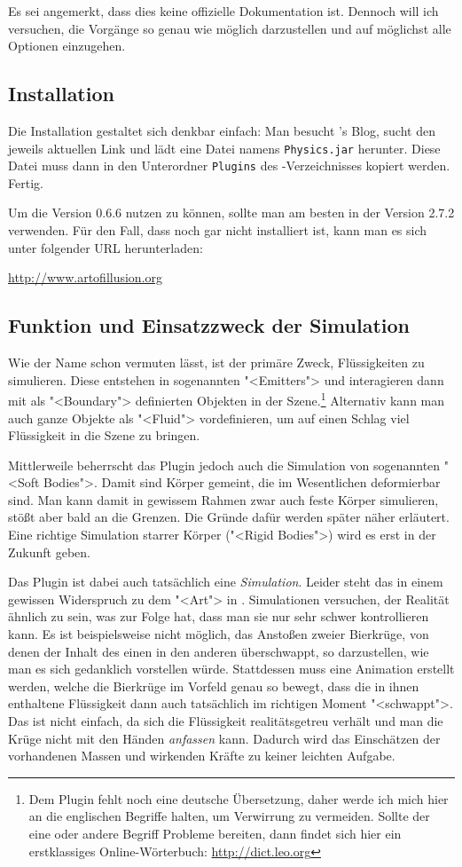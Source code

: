 \documentclass[12pt,a4paper]{scrartcl}
\begin{document}
Es sei angemerkt, dass dies keine offizielle Dokumentation ist. Dennoch
will ich versuchen, die Vorgänge so genau wie möglich darzustellen und
auf möglichst alle Optionen einzugehen.

\subsection{Installation}
Die Installation gestaltet sich denkbar einfach: Man besucht \deltor's
Blog, sucht den jeweils aktuellen Link und lädt eine Datei namens
\texttt{Physics.jar} herunter. Diese Datei muss dann in den Unterordner
\texttt{Plugins} des \aoi-Verzeichnisses kopiert werden. Fertig.

Um die Version 0.6.6 nutzen zu können, sollte man am besten \aoi
in der Version 2.7.2 verwenden. Für den Fall, dass \aoi noch gar nicht
installiert ist, kann man es sich unter folgender URL herunterladen:

\url{http://www.artofillusion.org}

\subsection{Funktion und Einsatzzweck der Simulation}
Wie der Name schon vermuten lässt, ist der primäre Zweck, Flüssigkeiten
zu simulieren. Diese entstehen in sogenannten "<Emitters"> und
interagieren dann mit als "<Boundary"> definierten Objekten in der
Szene.\footnote{Dem Plugin fehlt noch eine deutsche Übersetzung, daher
werde ich mich hier an die englischen Begriffe halten, um Verwirrung zu
vermeiden. Sollte der eine oder andere Begriff Probleme bereiten, dann
findet sich hier ein erstklassiges Online-Wörterbuch:
\url{http://dict.leo.org}} Alternativ kann man auch ganze Objekte
als "<Fluid"> vordefinieren, um auf einen Schlag viel Flüssigkeit in die
Szene zu bringen.

Mittlerweile beherrscht das Plugin jedoch auch die Simulation von
sogenannten "<Soft Bodies">. Damit sind Körper gemeint, die im
Wesentlichen deformierbar sind. Man kann damit in gewissem Rahmen zwar
auch feste Körper simulieren, stößt aber bald an die Grenzen. Die Gründe
dafür werden später näher erläutert. Eine richtige Simulation starrer
Körper ("<Rigid Bodies">) wird es erst in der Zukunft geben.

Das Plugin ist dabei auch tatsächlich eine \emph{Simulation}. Leider
steht das in einem gewissen Widerspruch zu dem "<Art"> in \aoi.
Simulationen versuchen, der Realität ähnlich zu sein, was zur Folge hat,
dass man sie nur sehr schwer kontrollieren kann. Es ist beispielsweise
nicht möglich, das Anstoßen zweier Bierkrüge, von denen der Inhalt des
einen in den anderen überschwappt, so darzustellen, wie man es sich
gedanklich vorstellen würde. Stattdessen muss eine Animation erstellt
werden, welche die Bierkrüge im Vorfeld genau so bewegt, dass die in
ihnen enthaltene Flüssigkeit dann auch tatsächlich im richtigen Moment
"<schwappt">.  Das ist nicht einfach, da sich die Flüssigkeit
realitätsgetreu verhält und man die Krüge nicht mit den Händen
\emph{anfassen} kann. Dadurch wird das Einschätzen der vorhandenen
Massen und wirkenden Kräfte zu keiner leichten Aufgabe.
\end{document}
